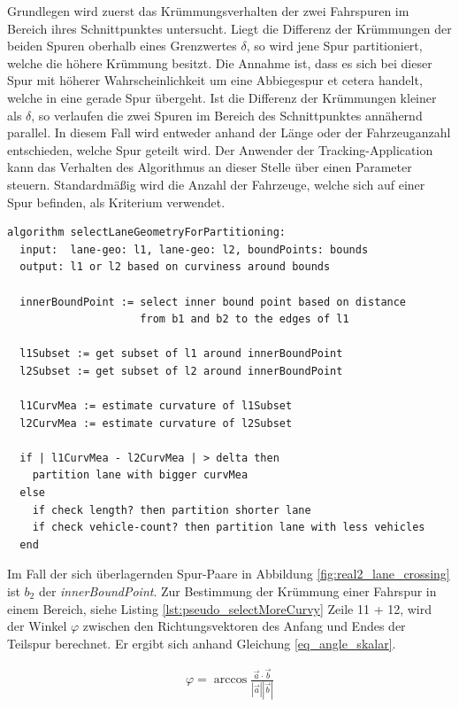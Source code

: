 Grundlegen wird zuerst das Krümmungsverhalten der zwei Fahrspuren im Bereich ihres Schnittpunktes untersucht.
Liegt die Differenz der Krümmungen der beiden Spuren oberhalb eines Grenzwertes $\delta$, so wird
jene Spur partitioniert, welche die höhere Krümmung besitzt. Die Annahme ist, dass es sich bei dieser
Spur mit höherer Wahrscheinlichkeit um eine Abbiegespur et cetera handelt, welche in eine gerade Spur übergeht.
Ist die Differenz der Krümmungen kleiner als $\delta$, so verlaufen die zwei Spuren im Bereich des Schnittpunktes
annähernd parallel. In diesem Fall wird entweder anhand der Länge oder der Fahrzeuganzahl entschieden,
welche Spur geteilt wird. Der Anwender der Tracking-Application kann das Verhalten des Algorithmus an dieser Stelle
über einen Parameter steuern. Standardmäßig wird die Anzahl der Fahrzeuge, welche sich auf einer Spur befinden,
als Kriterium verwendet.
\begin{lstlisting}[caption=Pseudocode Auswahl zu partitionierende Fahrspur, language=Pseudo, label=lst:pseudo_selectMoreCurvy]
algorithm selectLaneGeometryForPartitioning:
  input:  lane-geo: l1, lane-geo: l2, boundPoints: bounds
  output: l1 or l2 based on curviness around bounds

  innerBoundPoint := select inner bound point based on distance
                     from b1 and b2 to the edges of l1

  l1Subset := get subset of l1 around innerBoundPoint
  l2Subset := get subset of l2 around innerBoundPoint

  l1CurvMea := estimate curvature of l1Subset
  l2CurvMea := estimate curvature of l2Subset

  if | l1CurvMea - l2CurvMea | > delta then
    partition lane with bigger curvMea
  else
    if check length? then partition shorter lane
    if check vehicle-count? then partition lane with less vehicles
  end
\end{lstlisting}

Im Fall der sich überlagernden Spur-Paare in Abbildung \ref{fig:real2_lane_crossing} ist $b_2$ der \textit{innerBoundPoint}.
Zur Bestimmung der Krümmung einer Fahrspur in einem Bereich, siehe Listing \ref{lst:pseudo_selectMoreCurvy}
Zeile 11 + 12, wird der Winkel $\varphi$ zwischen den Richtungsvektoren des Anfang und Endes der Teilspur berechnet.
Er ergibt sich anhand Gleichung \ref{eq_angle_skalar}.

\begin{ceqn}
\begin{align}
\label{eq_angle_skalar}
    \varphi=\arccos \frac{\vec a \cdot \vec b}{|\vec a| |\vec b|}
\end{align}
\end{ceqn}

